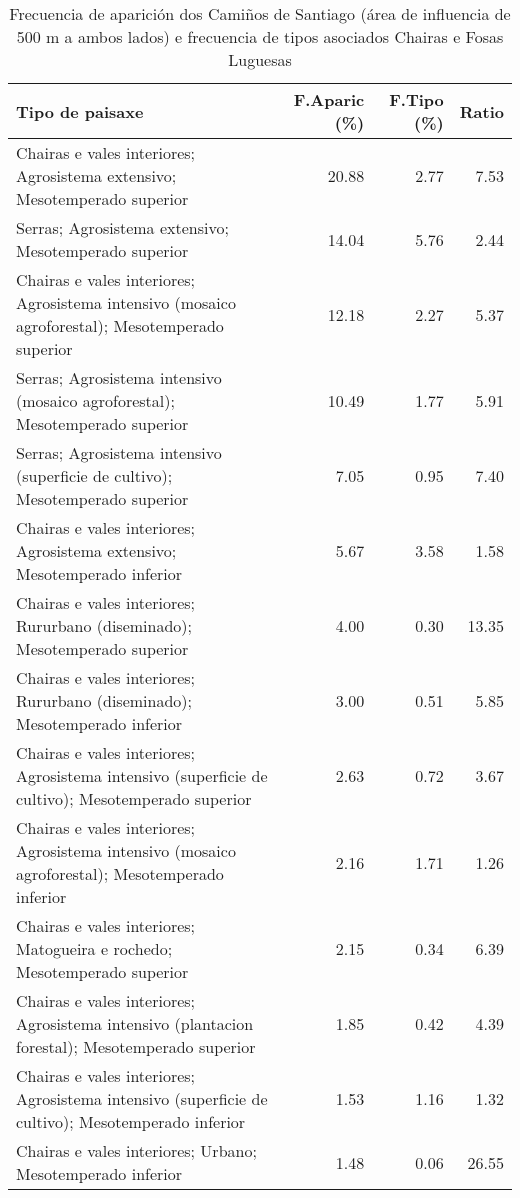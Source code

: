 \begin{table}[p]
\centering
\caption{Frecuencia de aparición dos Camiños de Santiago (área de influencia de 500 m a ambos lados) e frecuencia de tipos asociados Chairas e Fosas Luguesas} 
\label{vcamino6}
\begin{tabular}{lrrr}
  \hline
Tipo de paisaxe & F.Aparic (\%) & F.Tipo (\%) & Ratio \\ 
  \hline
Chairas e vales interiores; Agrosistema extensivo; Mesotemperado superior & 20.88 & 2.77 & 7.53 \\ 
  Serras; Agrosistema extensivo; Mesotemperado superior & 14.04 & 5.76 & 2.44 \\ 
  Chairas e vales interiores; Agrosistema intensivo (mosaico agroforestal); Mesotemperado superior & 12.18 & 2.27 & 5.37 \\ 
  Serras; Agrosistema intensivo (mosaico agroforestal); Mesotemperado superior & 10.49 & 1.77 & 5.91 \\ 
  Serras; Agrosistema intensivo (superficie de cultivo); Mesotemperado superior & 7.05 & 0.95 & 7.40 \\ 
  Chairas e vales interiores; Agrosistema extensivo; Mesotemperado inferior & 5.67 & 3.58 & 1.58 \\ 
  Chairas e vales interiores; Rururbano (diseminado); Mesotemperado superior & 4.00 & 0.30 & 13.35 \\ 
  Chairas e vales interiores; Rururbano (diseminado); Mesotemperado inferior & 3.00 & 0.51 & 5.85 \\ 
  Chairas e vales interiores; Agrosistema intensivo (superficie de cultivo); Mesotemperado superior & 2.63 & 0.72 & 3.67 \\ 
  Chairas e vales interiores; Agrosistema intensivo (mosaico agroforestal); Mesotemperado inferior & 2.16 & 1.71 & 1.26 \\ 
  Chairas e vales interiores; Matogueira e rochedo; Mesotemperado superior & 2.15 & 0.34 & 6.39 \\ 
  Chairas e vales interiores; Agrosistema intensivo (plantacion forestal); Mesotemperado superior & 1.85 & 0.42 & 4.39 \\ 
  Chairas e vales interiores; Agrosistema intensivo (superficie de cultivo); Mesotemperado inferior & 1.53 & 1.16 & 1.32 \\ 
  Chairas e vales interiores; Urbano; Mesotemperado inferior & 1.48 & 0.06 & 26.55 \\ 
   \hline
\end{tabular}
\end{table}
